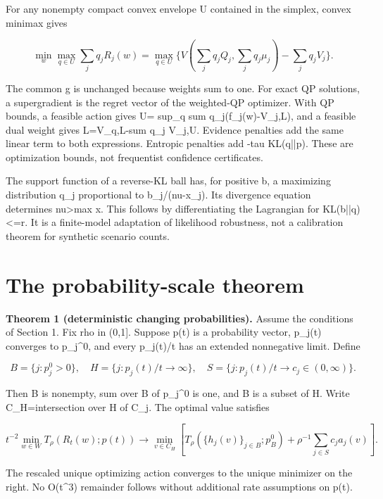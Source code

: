 \documentclass[10pt]{article}
\begin{document}
For any nonempty compact convex envelope U contained in the simplex, convex minimax gives

\begin{equation}
\min_w\max_{q\in U}\sum_jq_jR_j(w)
=\max_{q\in U}\{V(\sum_jq_jQ_j,\sum_jq_j\mu_j)-\sum_jq_jV_j\}.\tag{3}
\end{equation}



The common g is unchanged because weights sum to one. For exact QP solutions, a supergradient is the regret vector of the weighted-QP optimizer. With QP bounds, a feasible action gives U= sup\_q sum q\_j(f\_j(w)-V\_j,L), and a feasible dual weight gives L=V\_q,L-sum q\_j V\_j,U. Evidence penalties add the same linear term to both expressions. Entropic penalties add -tau KL(q||p). These are optimization bounds, not frequentist confidence certificates.

The support function of a reverse-KL ball has, for positive b, a maximizing distribution q\_j proportional to b\_j/(nu-x\_j). Its divergence equation determines nu>max x. This follows by differentiating the Lagrangian for KL(b||q)<=r. It is a finite-model adaptation of likelihood robustness, not a calibration theorem for synthetic scenario counts.

\section{The probability-scale theorem}

\textbf{Theorem 1 (deterministic changing probabilities).} Assume the conditions of Section 1. Fix rho in (0,1]. Suppose p(t) is a probability vector, p\_j(t) converges to p\_j\textasciicircum{}0, and every p\_j(t)/t has an extended nonnegative limit. Define

\[
B=\{j:p_j^0>0\},\quad H=\{j:p_j(t)/t\to\infty\},\quad
S=\{j:p_j(t)/t\to c_j\in(0,\infty)\}.
\]



Then B is nonempty, sum over B of p\_j\textasciicircum{}0 is one, and B is a subset of H. Write C\_H=intersection over H of C\_j. The optimal value satisfies

\begin{equation}
t^{-2}\min_{w\in W}T_\rho(R_t(w);p(t))\longrightarrow
\min_{v\in C_H}\left[T_\rho(\{h_j(v)\}_{j\in B};p_B^0)
+\rho^{-1}\sum_{j\in S}c_j a_j(v)\right].\tag{4}
\end{equation}



The rescaled unique optimizing action converges to the unique minimizer on the right. No O(t\textasciicircum{}3) remainder follows without additional rate assumptions on p(t).
\end{document}
